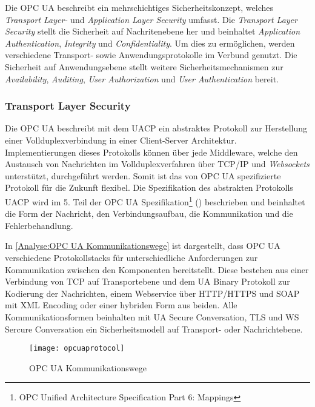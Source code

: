 Die \ac{OPC UA} beschreibt ein mehrschichtiges Sicherheitskonzept, welches \textit{Transport Layer-} und \textit{Application Layer Security} umfasst. Die \textit{Transport Layer Security} stellt die Sicherheit auf Nachritenebene her und beinhaltet \textit{Application Authentication}, \textit{Integrity} und \textit{Confidentiality}. Um dies zu ermöglichen, werden verschiedene Transport- sowie Anwendungsprotokolle im Verbund genutzt. Die Sicherheit auf Anwendungsebene stellt weitere Sicherheitsmechanismen zur \textit{Availability}, \textit{Auditing}, \textit{User Authorization} und \textit{User Authentication} bereit.

\subsubsection{Transport Layer Security}
Die \ac{OPC UA} beschreibt mit dem \ac{UACP} ein abstraktes Protokoll zur Herstellung einer Vollduplexverbindung in einer Client-Server Architektur. Implementierungen dieses Protokolls können über jede Middleware, welche den Austausch von Nachrichten im Vollduplexverfahren über \ac{TCP}/\ac{IP} und \textit{Websockets} unterstützt, durchgeführt werden. Somit ist das von \ac{OPC UA} spezifizierte Protokoll für die Zukunft flexibel. Die Spezifikation des abstrakten Protokolls \ac{UACP} wird im 5. Teil der \ac{OPC UA} Spezifikation\footnote{OPC Unified Architecture Specification Part 6: Mappings} (\cite{opcpt5}) beschrieben und beinhaltet die Form der Nachricht, den Verbindungsaufbau, die Kommunikation und die Fehlerbehandlung.

In \autoref{Analyse:OPC UA Kommunikationswege} ist dargestellt, dass \ac{OPC UA} verschiedene Protokollstacks für unterschiedliche Anforderungen zur Kommunikation zwischen den Komponenten bereitstellt. Diese bestehen aus einer Verbindung von \ac{TCP} auf Transportebene und dem \ac{UA} Binary Protokoll zur Kodierung der Nachrichten, einem Webservice über \ac{HTTP}/\ac{HTTPS} und \ac{SOAP} mit \ac{XML} Encoding oder einer hybriden Form aus beiden. Alle Kommunikationsformen beinhalten mit \ac{UA} Secure Conversation, \ac{TLS} und \ac{WS} Sercure Conversation ein Sicherheitsmodell auf Transport- oder Nachrichtebene.

\begin{figure}[h]
  \centering
  \texttt{[image: opcuaprotocol]}
  \caption{OPC UA Kommunikationswege} 
  \label{Analyse:OPC UA Kommunikationswege}
\end{figure}

\clearpage

